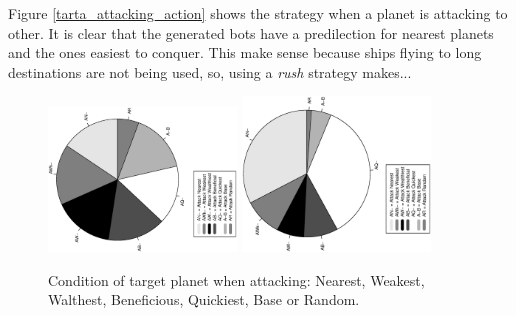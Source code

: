 \documentclass[conference]{IEEEtran}
\begin{document}
Figure \ref{tarta_attacking_action} shows the strategy when a planet is attacking to other. It is clear that the generated bots have a predilection for nearest planets and the ones easiest to conquer. This make sense because ships flying to long destinations are not being used, so, using a {\em rush} strategy makes...
\begin{figure}[htb]
\tiny
\begin{center}

    \includegraphics[trim=1cm 7cm 0cm 7cm, clip=true,width=5cm,angle=-90]{./imags/distribution_initial_attack.eps}
    \includegraphics[trim=1cm 7cm 0cm 7cm, clip=true,width=5cm,angle=-90]{./imags/distribution_final_attack.eps}

\end{center}
\caption{Condition of target planet when attacking: Nearest, Weakest, Walthest, Beneficious, Quickiest, Base or Random.}
\label{figura:tarta_attacking}
\end{figure}
\end{document}
